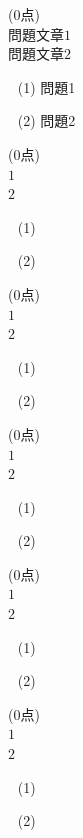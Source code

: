 \documentclass[a4paper]{ltjsarticle}
\begin{document}



\fontsize{14truept}{14truept}\selectfont

\white\white{}\noindent
{}　\;(0点)
\\[5mm]\indent
　$問題文章1$\\[2mm]
　$問題文章2$\\[1mm]
\begin{enumerate}
\item[　(1)] \spw 問題1
\item[　(2)] \spw 問題2
\end{enumerate}


\newpage\noindent
{}　\;(0点)
\\[5mm]\indent
　$1$\\[2mm]
　$2$\\[1mm]
\begin{enumerate}
\item[　(1)] 
\item[　(2)] 
\end{enumerate}


\newpage\noindent
{}　\;(0点)
\\[5mm]\indent
　$1$\\[2mm]
　$2$\\[1mm]
\begin{enumerate}
\item[　(1)] 
\item[　(2)] 
\end{enumerate}


\newpage\noindent
{}　\;(0点)
\\[5mm]\indent
　$1$\\[2mm]
　$2$\\[1mm]
\begin{enumerate}
\item[　(1)] 
\item[　(2)] 
\end{enumerate}


\newpage\noindent
{}　\;(0点)
\\[5mm]\indent
　$1$\\[2mm]
　$2$\\[1mm]
\begin{enumerate}
\item[　(1)] 
\item[　(2)] 
\end{enumerate}


\newpage\noindent
{}　\;(0点)
\\[5mm]\indent
　$1$\\[2mm]
　$2$\\[1mm]
\begin{enumerate}
\item[　(1)] 
\item[　(2)] 
\end{enumerate}

\vfill{}\leavevmode\\[6mm]
\white\white
\end{document}
